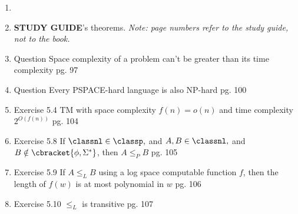 \documentclass[12pt]{article} %
\newcommand{\theoremitem}[3]{\item #1 \quad #2 \dotfill #3}
\newenvironment{theoremlist} {
    \begin{enumerate}[nosep,leftmargin=*,label={}]
} {
    \end{enumerate}
}
\begin{document}
\begin{theoremlist}
\begin{itemize}[nosep]
    \end{itemize}

    \item[]
    \item[]
    \textbf{STUDY GUIDE}'s theorems. \textit{Note: page numbers refer to the study guide, not to the book.}
    \theoremitem{Question}
    {Space complexity of a problem can't be greater than its time complexity}
    {pg. 97}
    \theoremitem{Question}
    {Every PSPACE-hard language is also NP-hard}
    {pg. 100}
    \theoremitem{Exercise 5.4}
    {TM with space complexity $f(n)=o(n)$ and time complexity $2^{O(f(n))}$}
    {pg. 104}
    \theoremitem{Exercise 5.8}
    {If $\classnl\in\classp,$ and $A,B\in\classnl,$ and $B\notin\cbracket{\phi,\Sigma^*}$, then $A\leq_P B$}
    {pg. 105}
    \theoremitem{Exercise 5.9}
    {If $A\leq_L B$ using a log space computable function $f$, then the length of $f(w)$ is at most polynomial in $w$}
    {pg. 106}
    \theoremitem{Exercise 5.10}
    {$\leq_L$ is transitive}
    {pg. 107}
    
\end{theoremlist}
\end{document}
